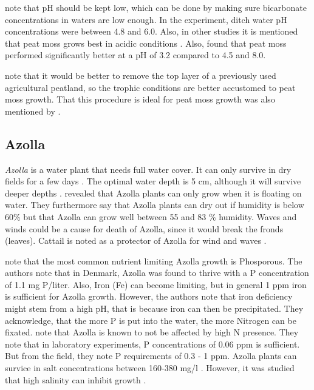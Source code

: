 \documentclass[a4paper,12pt]{scrbook}
\begin{document}
\citet{Temmink2017196} note that pH should be kept low, which can be done by making sure bicarbonate concentrations in waters are low enough. In the experiment, ditch water pH concentrations were between 4.8 and 6.0. Also, in other studies it is mentioned that peat moss grows best in acidic conditions \citep{wichtmann2016paludiculture}. Also, \citet{gaudig2005growing} found that peat moss performed significantly better at a pH of 3.2 compared to 4.5 and 8.0. 

\citet{fritz2014paludicultuur} note that it would be better to remove the top layer of a previously used agricultural peatland, so the trophic conditions are better accustomed to peat moss growth. That this procedure is ideal for peat moss growth was also mentioned by \citet{Temmink2017196}.

\subsection{Azolla}

\textit{Azolla} is a water plant that needs full water cover. It can only survive in dry fields for a few days \citep{wagner1997azolla}. The optimal water depth is 5 cm, although it will survive deeper depths \citep{wagner1997azolla}. \citet{sabetraftar2013review} revealed that Azolla plants can only grow when it is floating on water. They furthermore say that Azolla plants can dry out if humidity is below 60\% but that Azolla can grow well between 55 and 83 \% humidity.  Waves and winds could be a cause for death of Azolla, since it would break the fronds (leaves). Cattail is noted as a protector of Azolla for wind and waves \citep{sabetraftar2013review}.  

\citet{lumpkin1980azolla} note that the most common nutrient limiting Azolla growth is Phosporous. The authors note that in Denmark, Azolla was found to thrive with a P concentration of 1.1 mg P/liter. Also, Iron (Fe) can become limiting, but in general 1 ppm iron is  sufficient for Azolla growth. However, the authors note that iron deficiency might stem from a high pH, that is because iron can then be precipitated. They acknowledge, that the more P is put into the water, the more Nitrogen can be fixated. \citet{sabetraftar2013review} note that Azolla is known to not be affected by high N presence. They note that in laboratory experiments, P concentrations of 0.06 ppm  is sufficient. But from the field, they note P requirements of 0.3 - 1 ppm. Azolla plants can survice in salt concentrations between 160-380 mg/l  \citep{lumpkin1980azolla}. However, it was studied that high salinity can inhibit growth \citep{sabetraftar2013review, lumpkin1980azolla}. 
\end{document}
